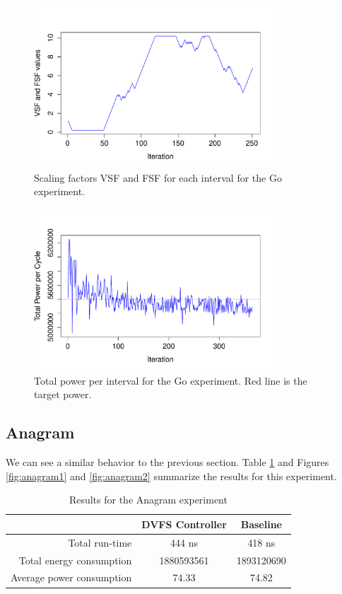 \documentclass[10pt]{scrartcl}
\begin{document}
\begin{figure}
  \centering
  \includegraphics[width=0.8\textwidth]{ScalingFactorsVsIteration}
  \caption{Scaling factors VSF and FSF for each interval for the Go experiment.}\label{fig:go1}
\end{figure}

\begin{figure}
  \centering
  \includegraphics[width=0.8\textwidth]{TotalPowerPerCycleVsIteration}
  \caption{Total power per interval for the Go experiment.  Red line is the target power.}\label{fig:go2}
\end{figure}


\subsection{Anagram}
We can see a similar behavior to the previous section.  Table \ref{tab:anagram} and Figures \ref{fig:anagram1} and \ref{fig:anagram2} summarize the results for this experiment.

\begin{table}[h!]
\centering
\begin{tabular}{rcc}
\toprule
& DVFS Controller & Baseline\\
\midrule
Total run-time & 444 ns & 418 ns \\
Total energy consumption & 1880593561 & 1893120690 \\
Average power consumption & 74.33 & 74.82 \\
\bottomrule
\end{tabular}
\caption{Results for the Anagram experiment}\label{tab:anagram}
\end{table}
\end{document}
